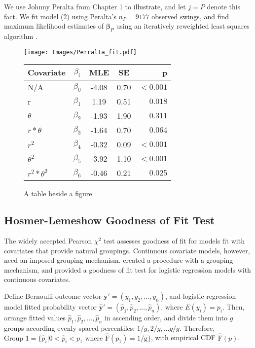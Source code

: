 We use Johnny Peralta from Chapter 1 to illustrate, and let $j = P$ denote this fact. We fit model (2) using Peralta's $n_{P} = 9177$ observed swings, and find maximum likelihood estimates of $\pmb{\beta}_{P}$ using an iteratively reweighted least squares algorithm \citep{Myers2012}.
  \begin{figure}[!ht]
    \centering
    \texttt{[image: Images/Perralta\_fit.pdf]}
    \qquad
\begin{tabular}[b]{ l | c | c | c | r }
    \hline
    Covariate         & $\beta_{i}$ & MLE   & SE     &      p \\ \hline \hline
    N/A               & $\beta_{0}$ & -4.08 & 0.70 & $ <0.001$ \\ \hline
    r                 & $\beta_{1}$ &  1.19 & 0.51 & $  0.018$ \\ \hline
    $\theta$          & $\beta_{2}$ & -1.93 & 1.90 & $  0.311$ \\ \hline
    $r*\theta$        & $\beta_{3}$ & -1.64 & 0.70 & $  0.064$ \\ \hline
    $r^{2}$           & $\beta_{4}$ & -0.32 & 0.09 & $ <0.001$ \\ \hline
    $\theta^{2}$      & $\beta_{5}$ & -3.92 & 1.10 & $ <0.001$ \\ \hline
    $r^{2}*\theta^{2}$& $\beta_{6}$ & -0.46 & 0.21 & $  0.025$ \\ \hline
    \hline
\end{tabular}
    \captionsetup{labelformat=andtable}
    \caption{A table beside a figure}
  \end{figure}

\subsection{Hosmer-Lemeshow Goodness of Fit Test} %

The widely accepted Pearson $\chi^{2}$ test assesses goodness of fit for models fit with covariates that provide natural groupings. Continuous covariate models, however, need an imposed grouping mechanism. \cite{Hosmer2013} created a procedure with a grouping mechanism, and provided a goodness of fit test for logistic regression models with continuous covariates. 

Define Bernoulli outcome vector $\pmb{y}' = (y_{1}, y_{2}, \dots, y_{n})$, and logistic regression model fitted probability vector $\hat{\pmb{y}}' = (\hat{p}_{1}, \hat{p}_{2}, \dots, \hat{p}_{n})$, where $E(y_{i}) = p_{i}$. Then, arrange fitted values $\hat{p}_{1}, \hat{p}_{2}, \dots, \hat{p}_{n}$ in ascending order, and divide them into $g$ groups according evenly spaced percentiles: $1/g, 2/g, \dots g/g$. Therefore, $\text{Group 1} = \{\hat{p}_{i}|0 < \hat{p}_{i} < p_{1} \text{ where } \hat{\text{F}}(p_{1})=1/\text{g} \}$, with empirical CDF $\hat{\text{F}}(p)$. 

